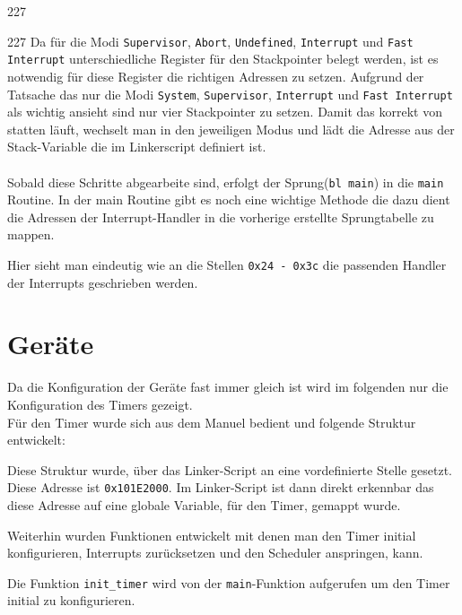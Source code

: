 \begin{dinglist}{227}
\begin{dinglist}{227}
Da f\"ur die Modi \texttt{Supervisor}, \texttt{Abort}, \texttt{Undefined}, \texttt{Interrupt} und \texttt{Fast Interrupt} unterschiedliche Register f\"ur den Stackpointer belegt werden, ist es notwendig f\"ur diese Register die richtigen Adressen zu setzen. Aufgrund der Tatsache das \mops nur die Modi \texttt{System}, \texttt{Supervisor}, \texttt{Interrupt} und \texttt{Fast Interrupt} als wichtig ansieht sind nur vier Stackpointer zu setzen. Damit das korrekt von statten l\"auft, wechselt man in den jeweiligen Modus und l\"adt die Adresse aus der  Stack-Variable die im Linkerscript definiert ist.\\\\
Sobald diese Schritte abgearbeite sind, erfolgt der Sprung(\texttt{bl main}) in die \texttt{main} Routine.
In der main Routine gibt es noch eine wichtige Methode die dazu dient die Adressen der Interrupt-Handler in die vorherige erstellte Sprungtabelle zu mappen.
 
Hier sieht man eindeutig wie an die Stellen \texttt{0x24 - 0x3c} die passenden Handler der Interrupts geschrieben werden. 
\end{dinglist}
\end{dinglist} 
\section{Ger\"ate}
Da die Konfiguration der Ger\"ate fast immer gleich ist wird im folgenden nur die Konfiguration des Timers gezeigt. \\
F\"ur den Timer wurde sich aus dem Manuel\parencite[vgl. Tabelle 3-1][34]{timerRef} bedient und folgende Struktur entwickelt:
 
Diese Struktur wurde, \"uber das Linker-Script an eine vordefinierte Stelle gesetzt. Diese Adresse ist \texttt{0x101E2000}\parencite[vgl. Tabelle 4-72][262]{archManI}. Im Linker-Script ist dann direkt erkennbar das diese Adresse auf eine globale Variable, f\"ur den Timer, gemappt wurde.

Weiterhin wurden Funktionen entwickelt mit denen man den Timer initial  konfigurieren, Interrupts zur\"ucksetzen und den Scheduler anspringen, kann.

Die Funktion \texttt{init\_timer} wird von der \texttt{main}-Funktion aufgerufen um den Timer initial zu konfigurieren.
